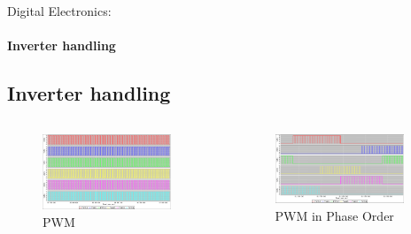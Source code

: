 \documentclass{beamer}
\begin{document}
	\begin{frame}{Digital Electronics:}
		\framesubtitle{Inverter handling}
		\subsection[Inverter]{Inverter handling}
		\begin{columns}[T]
	  		\begin{column}{0.5\textwidth}
		    	\begin{figure}
		    		\includegraphics[width=0.9\textwidth]{../Illus/PWM100.png}\hspace*{1em}
	    			\caption{PWM}
	    		 \end{figure}
	  		\end{column}
	  		\begin{column}{0.5\textwidth}
	  			\begin{figure}
	    			\hspace*{1em}\includegraphics[width=0.9\textwidth]{../Illus/PWMCadence2015.png}\hspace*{1em}
	    			\caption{PWM in Phase Order}
	    		\end{figure}
	  		\end{column}
	  	\end{columns}
	\end{frame}
	
\end{document}
